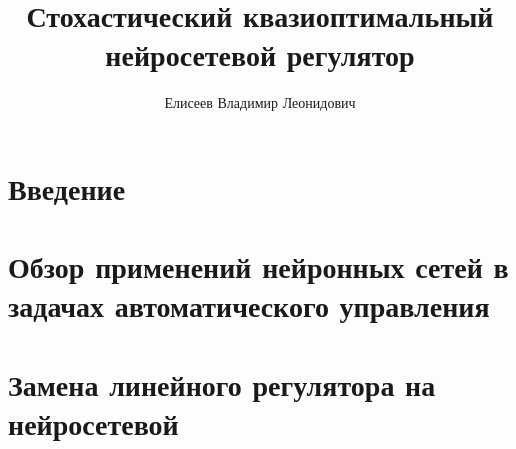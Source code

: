 \documentclass[12pt]{rusthesis}
\title{Стохастический квазиоптимальный нейросетевой регулятор}
\author{Елисеев Владимир Леонидович}
\begin{document}

\setcounter{tocdepth}{3}\tableofcontents

\chapter*{Введение}

%

\chapter{Обзор применений нейронных сетей в задачах автоматического управления}



\chapter{Замена линейного регулятора на нейросетевой}

\end{document}
